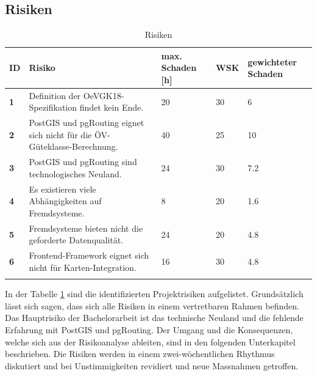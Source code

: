 \subsection{Risiken}
\label{Projektmanagement:Risiken}

\begin{longtable}{p{0.5cm} p{7cm} p{2cm} p{2cm} p{2cm}}
    \toprule
      \textbf{ID}
    & \textbf{Risiko}
    & \textbf{max. Schaden [h]}
    & \textbf{WSK}
    & \textbf{gewichteter Schaden} \\
    \midrule
    \textbf{1}
                    & Definition der \gls{OeVGK18}-Spezifikation findet kein Ende.
                    & 20
                    & 30%
                    & 6 \\
    \textbf{2}
                    & PostGIS und pgRouting eignet sich nicht für die \acs{ÖV}-Güteklasse-Berechnung.
                    & 40
                    & 25%
                    & 10 \\
    \textbf{3}
                    & PostGIS und pgRouting sind technologisches Neuland.
                    & 24
                    & 30%
                    & 7.2 \\
    \textbf{4}
                    & Es existieren viele Abhängigkeiten auf Fremdsysteme.
                    & 8
                    & 20%
                    & 1.6 \\
    \textbf{5}
                    & Fremdsysteme bieten nicht die geforderte Datenqualität.
                    & 24
                    & 20%
                    & 4.8 \\
    \textbf{6}
                    & Frontend-Framework eignet sich nicht für Karten-Integration.
                    & 16
                    & 30%
                    & 4.8 \\
    \bottomrule
    \caption{Risiken}
    \label{table:Risiken}
\end{longtable}

In der Tabelle \ref{table:Risiken} sind die identifizierten Projektrisiken aufgelistet.
Grundsätzlich lässt sich sagen, dass sich alle Risiken in einem vertretbaren Rahmen befinden.
Das Hauptrisiko der Bachelorarbeit ist das technische Neuland und die fehlende Erfahrung mit PostGIS und pgRouting.
Der Umgang und die Konsequenzen, welche sich aus der Risikoanalyse ableiten, sind in den folgenden Unterkapitel beschrieben.
Die Risiken werden in einem zwei-wöchentlichen Rhythmus diskutiert und bei Unstimmigkeiten revidiert und neue Massnahmen getroffen.

